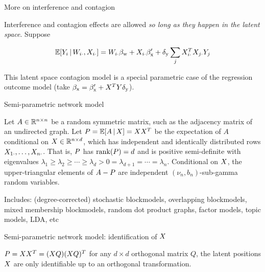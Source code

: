 \documentclass{beamer}
\theoremstyle{remark}
\begin{document}
\begin{frame}{More on interference and contagion}

    Interference and contagion effects are allowed \emph{so long as they happen in the latent space}. Suppose

    \begin{align*}
        \E[\W_{i \cdot}, \X_{i \cdot}]{Y_i}
        = \W_{i \cdot} \betaw + \X_{i \cdot} \beta'_\text{x} + \delta_\text{y} \sum_{j} \X_{i \cdot}^T \X_{j \cdot} Y_j
    \end{align*}

    This latent space contagion model is a special parametric case of the regression outcome model (take $\beta_\text{x} = \beta'_\text{x} + X^T Y \delta_\text{y}$).

\end{frame}

\begin{frame}{Semi-parametric network model}

    Let $A \in \mathbb{R}^{n \times n}$ be a random symmetric matrix, such as the adjacency matrix of an undirected graph. Let $\Apop = \E[\X]{A} = \X \X^T$ be the expectation of $A$ conditional on $X \in \mathbb{R}^{n \times d}$, which has independent and identically distributed rows $X_{1 \cdot}, \dots, X_{n \cdot}$. That is, $P$ has $\rank \paren*{\Apop} = d$ and is positive semi-definite with eigenvalues $\lambda_1 \ge \lambda_2 \ge \cdots \ge \lambda_d > 0 = \lambda_{d+1} = \cdots = \lambda_n$. Conditional on $X$, the upper-triangular elements of $A - P$ are independent $(\nu_n, b_n)$-sub-gamma random variables.

    Includes: (degree-corrected) stochastic blockmodels, overlapping blockmodels, mixed membership blockmodels, random dot product graphs, factor models, topic models, LDA, etc
\end{frame}


\begin{frame}{Semi-parametric network model: identification of $X$}

    $P = X X^T = (X Q) (X Q)^T$ for any $d \times d$ orthogonal matrix $Q$, the latent positions $X$ are only identifiable up to an orthogonal transformation.
\end{frame}
\end{document}
